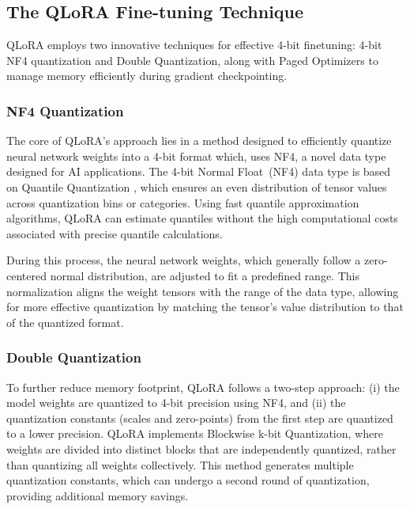 \subsection{The QLoRA Fine-tuning Technique}
\label{sub:design_qlora}

QLoRA employs two innovative techniques for effective 4-bit finetuning: 4-bit NF4 quantization and Double Quantization, along with Paged Optimizers to manage memory efficiently during gradient checkpointing.



\subsubsection{NF4 Quantization}

The core of QLoRA’s approach lies in a method designed to efficiently quantize neural network weights into a 4-bit format which, uses NF4, a novel data type designed for AI applications. The 4-bit Normal Float~(NF4) data type is based on Quantile Quantization \cite{dettmers20218}, which ensures an even distribution of tensor values across quantization bins or categories. Using fast quantile approximation algorithms, QLoRA can estimate quantiles without the high computational costs associated with precise quantile calculations.

During this process, the neural network weights, which generally follow a zero-centered normal distribution, are adjusted to fit a predefined range. This normalization aligns the weight tensors with the range of the data type, allowing for more effective quantization by matching the tensor’s value distribution to that of the quantized format.


\subsubsection{Double Quantization}
To  further reduce memory footprint, QLoRA follows a two-step approach: (i) the model weights are quantized to 4-bit precision using NF4, and (ii) the quantization constants (scales and zero-points) from the first step are quantized to a lower precision. 
QLoRA implements Blockwise k-bit Quantization, where weights are divided into distinct blocks that are independently quantized, rather than quantizing all weights collectively. This method generates multiple quantization constants, which can undergo a second round of quantization, providing additional memory savings.

